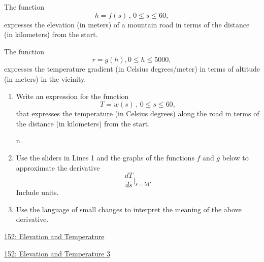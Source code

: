 \documentclass{ximera}
\begin{document}
\begin{question}  \label{Q9erKKe33399}
The function
\[
   h = f(s) \, , \, 0\leq s \leq 60 ,
\]
expresses the elevation (in meters) of a mountain road in terms of the distance (in kilometers) from the start.

The function 
\[
    r = g(h) , 0\leq h \leq 5000 ,
\] 
expresses the temperature gradient (in Celsius degrees/meter) in terms of altitude (in meters) in the vicinity.

\begin{enumerate}
\item Write an expression for the function
\[
 T = w(s) \, , \, 0\leq s \leq 60 ,
\]
that expresses the temperature (in Celsius degrees) along the road in terms of the distance (in kilometers) from the start.

n.

\item Use the sliders in Lines 1 and the graphs of the functions $f$ and $g$ below to approximate the derivative
\[
   \frac{dT}{ds}\Big|_{s=54} .
\]
Include units.

\item Use the language of small changes to interpret the meaning of the above derivative.
\end{enumerate}

\begin{onlineOnly}
    \begin{center}
\end{center}
\end{onlineOnly}

\href{https://www.desmos.com/calculator/gcmfa2a6jz}{152: Elevation and Temperature}

\begin{onlineOnly}
    \begin{center}
\end{center}
\end{onlineOnly}

\href{https://www.desmos.com/calculator/vvr0qrgoh1}{152: Elevation and Temperature 3}
\end{question}
\end{document}
